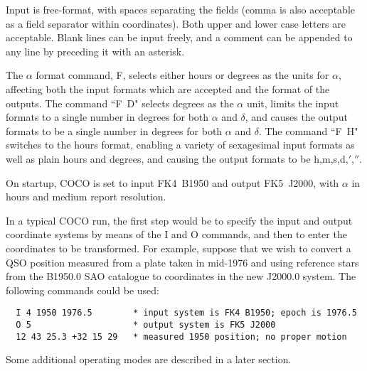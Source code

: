 Input is free-format, with spaces separating the fields (comma is
also acceptable as a field separator within coordinates).
Both upper and lower case letters are acceptable.
Blank lines can be input freely, and a comment can be appended to
any line by preceding it with an asterisk.

The $\alpha$ format command, F, selects either hours or degrees as
the units for $\alpha$, affecting both the input formats which are
accepted and the format of the outputs.  The command ``F~D"
selects degrees as the $\alpha$ unit, limits the input formats
to a single number in degrees for both $\alpha$ and $\delta$, and
causes the output formats to be a single number in degrees
for both $\alpha$ and $\delta$.  The command ``F~H" switches to the
hours format, enabling a variety of sexagesimal input
formats as well as plain hours and degrees, and causing
the output formats to be h,m,s,d,$'$,$''$.

On startup, COCO is set to input FK4~B1950 and output
FK5~J2000, with $\alpha$ in hours and medium report resolution.

In a typical COCO run, the first step would be to specify the
input and output coordinate systems by means of the I and O
commands, and then to enter the coordinates to be
transformed.
For example, suppose that we wish to convert
a QSO position measured from a plate taken in mid-1976 and
using reference stars from the B1950.0 SAO catalogue to coordinates
in the new J2000.0 system.
The following commands could be used:
\begin{verbatim}
  I 4 1950 1976.5        * input system is FK4 B1950; epoch is 1976.5
  O 5                    * output system is FK5 J2000
  12 43 25.3 +32 15 29   * measured 1950 position; no proper motion
\end{verbatim}

Some additional operating modes are described in a later section.

